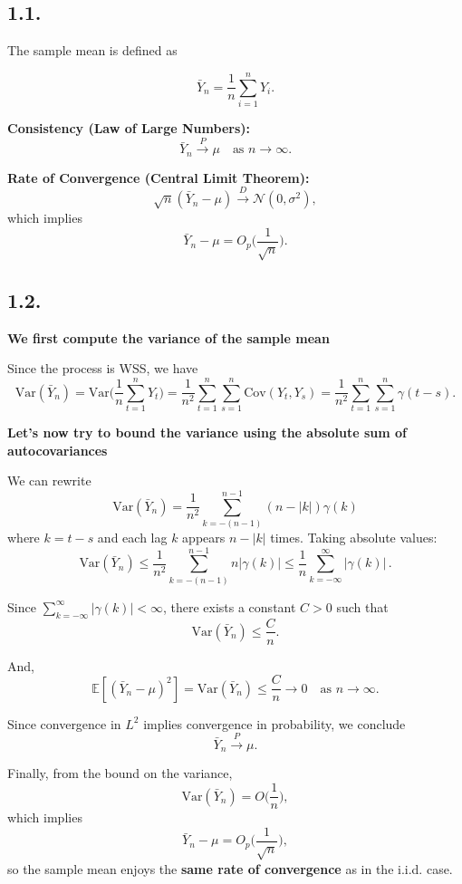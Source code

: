 \documentclass[11pt]{article}
\begin{document}
\begin{solution}  %
\subsection*{1.1.}

The sample mean is defined as

\[
\bar{Y}_n = \frac{1}{n} \sum_{i=1}^n Y_i.
\]

\textbf{Consistency (Law of Large Numbers):}
\[
\bar{Y}_n \xrightarrow{P} \mu \quad \text{as } n \to \infty.
\]

\textbf{Rate of Convergence (Central Limit Theorem):}
\[
\sqrt{n} (\bar{Y}_n - \mu) \xrightarrow{D} \mathcal{N}(0, \sigma^2),
\]
which implies
\[
\bar{Y}_n - \mu = O_p\Big(\frac{1}{\sqrt{n}}\Big).
\]

\subsection*{1.2.}

\textbf{We first compute the variance of the sample mean}

Since the process is WSS, we have
\[
\text{Var}(\bar{Y}_n) = \text{Var}\Big(\frac{1}{n} \sum_{t=1}^n Y_t \Big) 
= \frac{1}{n^2} \sum_{t=1}^n \sum_{s=1}^n \text{Cov}(Y_t, Y_s)
= \frac{1}{n^2} \sum_{t=1}^n \sum_{s=1}^n \gamma(t-s).
\]

\textbf{Let's now try to bound the variance using the absolute sum of autocovariances}

We can rewrite
\[
\text{Var}(\bar{Y}_n) = \frac{1}{n^2} \sum_{k=-(n-1)}^{n-1} (n-|k|) \gamma(k)
\]
where \(k = t-s\) and each lag \(k\) appears \(n-|k|\) times. Taking absolute values:
\[
\text{Var}(\bar{Y}_n) \le \frac{1}{n^2} \sum_{k=-(n-1)}^{n-1} n |\gamma(k)| 
\le \frac{1}{n} \sum_{k=-\infty}^{\infty} |\gamma(k)| \,.
\]

Since \(\sum_{k=-\infty}^{\infty} |\gamma(k)| < \infty\), there exists a constant \(C > 0\) such that
\[
\text{Var}(\bar{Y}_n) \le \frac{C}{n}.
\]

And,
\[
\mathbb{E}[(\bar{Y}_n - \mu)^2] = \text{Var}(\bar{Y}_n) \le \frac{C}{n} \longrightarrow 0 \quad \text{as } n \to \infty.
\]

Since convergence in \(L^2\) implies convergence in probability, we conclude
\[
\bar{Y}_n \xrightarrow{P} \mu.
\]

Finally, from the bound on the variance,
\[
\text{Var}(\bar{Y}_n) = O\Big(\frac{1}{n}\Big),
\]
which implies
\[
\bar{Y}_n - \mu = O_p\Big(\frac{1}{\sqrt{n}}\Big),
\]
so the sample mean enjoys the \textbf{same rate of convergence} as in the i.i.d. case.


\end{solution}
\end{document}

